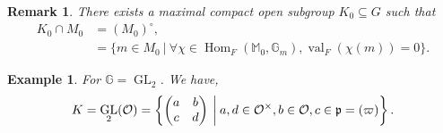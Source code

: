\documentclass[8pt]{article}
\newtheorem{remark}{Remark}[section]
\newtheorem{example}{Example}[section]
\DeclareMathOperator{\GL}{GL}
\DeclareMathOperator{\Hom}{Hom}
\DeclareMathOperator{\val}{val}
\newcommand{\G}[0]{\mathbb{G}}
\newcommand{\M}[0]{\mathbb{M}}
\newcommand{\sep}[0]{\:|\:}
\begin{document}
\begin{remark}
  \label{remark_maximal_compact}
  There exists a maximal compact open subgroup $K_0\subseteq G$ such that 
  \begin{align*}
    K_0\cap M_0 & = (M_0)^\circ,\\
    & = \{m\in M_0\sep \forall \chi\in\Hom_F(\M_0,\G_m), \val_F(\chi(m))=0\}.
  \end{align*}
\end{remark}

\begin{example}
  For $\G = \GL_2$. We have,
  \begin{equation*}
    K = \GL_2(\mathcal{O}) = \left\{\begin{pmatrix}
    a & b \\ c& d
    \end{pmatrix}
    \:\bigg{|}\: a,d\in\mathcal{O}^\times,b\in\mathcal{O}, c\in\mathfrak{p} = (\varpi)\right\}.
  \end{equation*}
\end{example}
\end{document}
